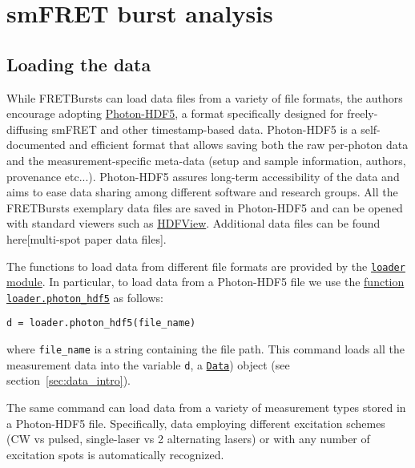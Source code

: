 \section{smFRET burst analysis}
\label{sec:analysis}

\subsection{Loading the data}
\label{sec:dataload}

While FRETBursts can load data files from a variety of file formats,
the authors encourage adopting \href{http://photon-hdf5.readthedocs.org/}{Photon-HDF5},
a format specifically designed for freely-diffusing smFRET and other timestamp-based data. 
Photon-HDF5 is a self-documented and efficient format
that allows saving both the raw per-photon data and the measurement-specific meta-data
(setup and sample information, authors, provenance etc...).
Photon-HDF5 assures long-term accessibility of the data and aims to ease data sharing 
among different software and research groups.
All the FRETBursts exemplary data files are saved in Photon-HDF5 and can be opened with 
standard viewers such as \href{http://www.hdfgroup.org/products/java/hdfview/}{HDFView}. 
Additional data files can be found here[multi-spot paper data files].

The functions to load data from different file formats are provided by
the \href{http://fretbursts.readthedocs.org/en/latest/loader.html}{\texttt{loader} module}.
In particular, to load data from a Photon-HDF5 file we use the 
\href{http://fretbursts.readthedocs.org/en/latest/loader.html#fretbursts.loader.photon_hdf5}{function \texttt{loader.photon\_hdf5}} as follows:

\begin{verbatim}
d = loader.photon_hdf5(file_name)
\end{verbatim}

where \verb|file_name| is a string containing the file path. 
This command loads all the measurement data into the variable \verb|d|,
a \href{http://fretbursts.readthedocs.org/en/latest/data_class.html}{\texttt{Data}}) object 
(see section~\ref{sec:data_intro}).

The same command can load data from a variety of measurement types stored 
in a Photon-HDF5 file. Specifically, data employing different excitation schemes 
(CW vs pulsed, single-laser vs 2 alternating lasers) or with any number of excitation spots
is automatically recognized.

